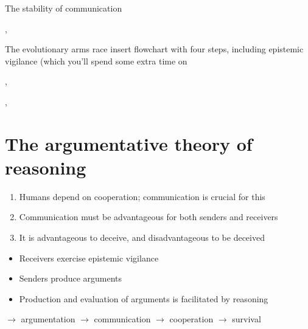 \documentclass[xcolor=table]{beamer}       %
\begin{document}
\begin{frame}{The stability of communication}
\begin{center}
    \end{center}
    \scriptsize{\citet{Scott-Phillips08}, }
\end{frame}

\begin{frame}{The evolutionary arms race}
    insert flowchart with four steps, including epistemic vigilance (which you'll spend some extra time on

    \scriptsize{\citet{Sperber01}, }

    \scriptsize{\citet{Sperber10}, }
\end{frame}

\section{The argumentative theory of reasoning}

\begin{frame}{\insertsection}
    \begin{block}{\citet{MS11}}
    \begin{enumerate}[<+->]
        \item Humans depend on cooperation; communication is crucial for this
        \item Communication must be advantageous for both senders and receivers
        \item It is advantageous to deceive, and disadvantageous to be deceived
    \end{enumerate}
    \begin{itemize}[<+->]
        \item Receivers exercise epistemic vigilance
        \item Senders produce arguments
        \item Production and evaluation of arguments is facilitated by \alert{reasoning}
    \end{itemize}
    \end{block}
    \centering
    \pause $\to$ argumentation
    \pause $\to$ communication
    \pause $\to$ cooperation
    \pause $\to$ survival
\end{frame}
\end{document}
